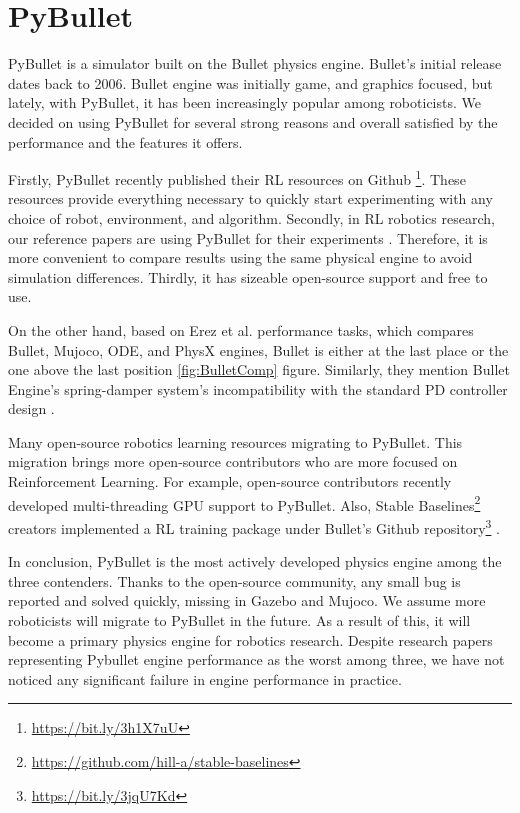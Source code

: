 \section{PyBullet}

PyBullet is a simulator built on the Bullet physics engine. Bullet's initial release dates back to 2006. Bullet engine was initially game, and graphics focused, but lately, with PyBullet, it has been increasingly popular among roboticists. We decided on using PyBullet for several strong reasons and overall satisfied by the performance and the features it offers. 

Firstly, PyBullet recently published their RL resources on Github \footnote{\url{https://bit.ly/3h1X7uU}}. These resources provide everything necessary to quickly start experimenting with any choice of robot, environment, and algorithm. Secondly, in RL robotics research, our reference papers are using PyBullet for their experiments \cite{Quillen2018} \cite{Breyer2018}. Therefore, it is more convenient to compare results using the same physical engine to avoid simulation differences. Thirdly, it has sizeable open-source support and free to use. 

On the other hand, based on Erez et al. performance tasks, which compares Bullet, Mujoco, ODE, and PhysX engines, Bullet is either at the last place or the one above the last position \ref{fig:BulletComp} figure. Similarly, they mention Bullet Engine's spring-damper system's incompatibility with the standard PD controller design \cite{Erez2015}.

Many open-source robotics learning resources migrating to PyBullet. This migration brings more open-source contributors who are more focused on Reinforcement Learning. For example, open-source contributors recently developed multi-threading GPU support to PyBullet. Also, Stable Baselines\footnote{\url{https://github.com/hill-a/stable-baselines}} creators implemented a RL training package under Bullet's Github repository\footnote{\url{https://bit.ly/3jqU7Kd}} \cite{stable-baselines}. 

In conclusion, PyBullet is the most actively developed physics engine among the three contenders. Thanks to the open-source community, any small bug is reported and solved quickly, missing in Gazebo and Mujoco. We assume more roboticists will migrate to PyBullet in the future. As a result of this, it will become a primary physics engine for robotics research. Despite research papers representing Pybullet engine performance as the worst among three, we have not noticed any significant failure in engine performance in practice.

